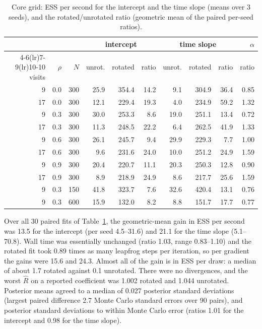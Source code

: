 \begin{table}[t]
\centering
\caption{Core grid: ESS per second for the intercept and the time slope
(means over 3 seeds), and the rotated/unrotated ratio (geometric mean of
the paired per-seed ratios).}
\label{tab:core}
\small
\begin{tabular}{rrr rrr rrr r}
\toprule
& & & \multicolumn{3}{c}{intercept} & \multicolumn{3}{c}{time slope} & $\alpha$ \\
\cmidrule(lr){4-6}\cmidrule(lr){7-9}\cmidrule(lr){10-10}
visits & $\rho$ & $N$ & unrot. & rotated & ratio & unrot. & rotated & ratio & ratio \\
\midrule
9  & 0.0 & 300 & 25.9 & 354.4 & 14.2 &  9.1 & 304.9 & 36.4 & 0.85 \\
17 & 0.0 & 300 & 12.1 & 229.4 & 19.3 &  4.0 & 234.9 & 59.2 & 1.32 \\
9  & 0.3 & 300 & 30.0 & 253.3 &  8.6 & 19.0 & 251.1 & 13.4 & 0.72 \\
17 & 0.3 & 300 & 11.3 & 248.5 & 22.2 &  6.4 & 262.5 & 41.9 & 1.33 \\
9  & 0.6 & 300 & 26.1 & 245.7 &  9.4 & 29.9 & 229.3 &  7.7 & 1.00 \\
17 & 0.6 & 300 &  9.6 & 231.6 & 24.0 & 10.0 & 251.2 & 24.9 & 1.59 \\
9  & 0.9 & 300 & 20.4 & 220.7 & 11.1 & 20.3 & 250.3 & 12.8 & 0.90 \\
17 & 0.9 & 300 &  8.9 & 218.9 & 24.9 &  8.6 & 217.7 & 25.6 & 1.59 \\
9  & 0.3 & 150 & 41.8 & 323.7 &  7.6 & 32.6 & 420.4 & 13.1 & 0.76 \\
9  & 0.3 & 600 & 15.9 & 132.0 &  8.2 &  8.8 & 151.7 & 17.7 & 0.77 \\
\bottomrule
\end{tabular}
\end{table}

Over all 30 paired fits of Table~\ref{tab:core}, the geometric-mean gain
in ESS per second was 13.5 for the intercept (per seed 4.5--31.6) and 21.1
for the time slope (5.1--70.8). Wall time was essentially unchanged (ratio
1.03, range 0.83--1.10) and the rotated fit took 0.89 times as many
leapfrog steps per iteration, so per gradient the gains were 15.6 and
24.3. Almost all of the gain is in ESS per draw: a median of about 1.7 rotated
against 0.1 unrotated. There were no divergences, and the worst $\hat R$ on a
reported coefficient was 1.002 rotated and 1.044 unrotated. Posterior
means agreed to a median of 0.027 posterior standard deviations (largest
paired difference 2.7 Monte Carlo standard errors over 90 pairs), and
posterior standard deviations to within Monte Carlo error (ratios 1.01 for
the intercept and 0.98 for the time slope).


